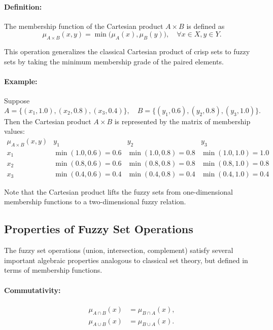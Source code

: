 \paragraph{Definition:} The membership function of the Cartesian product $A \times B$ is defined as
\begin{equation}
    \mu_{A \times B}(x, y) = \min\big(\mu_A(x), \mu_B(y)\big), \quad \forall x \in X, y \in Y.
    \label{eq:cartesian_product}
\end{equation}

This operation generalizes the classical Cartesian product of crisp sets to fuzzy sets by taking the minimum membership grade of the paired elements.

\paragraph{Example:} Suppose
\[
A = \{(x_1, 1.0), (x_2, 0.8), (x_3, 0.4)\}, \quad B = \{(y_1, 0.6), (y_2, 0.8), (y_3, 1.0)\}.
\]
Then the Cartesian product $A \times B$ is represented by the matrix of membership values:
\[
\begin{array}{c|ccc}
\mu_{A \times B}(x, y) & y_1 & y_2 & y_3 \\ \hline
x_1 & \min(1.0, 0.6) = 0.6 & \min(1.0, 0.8) = 0.8 & \min(1.0, 1.0) = 1.0 \\
x_2 & \min(0.8, 0.6) = 0.6 & \min(0.8, 0.8) = 0.8 & \min(0.8, 1.0) = 0.8 \\
x_3 & \min(0.4, 0.6) = 0.4 & \min(0.4, 0.8) = 0.4 & \min(0.4, 1.0) = 0.4
\end{array}
\]

Note that the Cartesian product lifts the fuzzy sets from one-dimensional membership functions to a two-dimensional fuzzy relation.

\subsection{Properties of Fuzzy Set Operations}
\label{sec:fuzzysets_properties_of_fuzzy_set_operations}

The fuzzy set operations (union, intersection, complement) satisfy several important algebraic properties analogous to classical set theory, but defined in terms of membership functions.

\paragraph{Commutativity:}
\begin{align*}
    \mu_{A \cap B}(x) &= \mu_{B \cap A}(x), \\
    \mu_{A \cup B}(x) &= \mu_{B \cup A}(x).
\end{align*}

